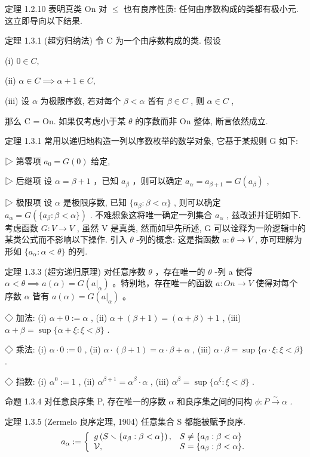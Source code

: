 \documentclass[]{article}
\begin{document}
定理 1.2.10 表明真类 On 对 $\leq$ 也有良序性质: 任何由序数构成的类都有极小元. 这立即导向以下结果. 

定理 1.3.1 (超穷归纳法) 令 C 为一个由序数构成的类. 假设 

(i) $0 \in C,$ 

(ii) $\alpha \in C \implies \alpha + 1 \in C,$ 

(iii) 设 $\alpha$ 为极限序数, 若对每个 $\beta < \alpha$ 皆有 $\beta \in C$ , 则 $\alpha \in C$ , 

那么 C = On. 如果仅考虑小于某 $\theta$ 的序数而非 On 整体, 断言依然成立. 

定理 1.3.1 常用以递归地构造一列以序数枚举的数学对象, 它基于某规则 G 如下: 

▷ 第零项 $a_{0}=G(0)$ 给定, 

▷ 后继项 设 $\alpha = \beta + 1$ ，已知 $a_{\beta}$ ，则可以确定 $a_{\alpha} = a_{\beta+1} = G(a_{\beta})$ , 

▷ 极限项 设 $\alpha$ 是极限序数, 已知 $\{a_{\beta} : \beta < \alpha\}$ , 则可以确定 $a_{\alpha} = G(\{a_{\beta} : \beta < \alpha\})$ . 不难想象这将唯一确定一列集合 $a_{\alpha}$ , 兹改述并证明如下. 考虑函数 $G : V \to V$ , 虽然 V 是真类, 然而如早先所述, G 可以诠释为一阶逻辑中的某类公式而不影响以下操作. 引入 $\theta$ -列的概念: 这是指函数 $a : \theta \to V$ , 亦可理解为形如 $\{a_{\alpha} : \alpha < \theta\}$ 的列. 

定理 1.3.3 (超穷递归原理) 对任意序数 $\theta$ ，存在唯一的 $\theta$ -列 a 使得 $\alpha < \theta \implies a(\alpha) = G(a|_{\alpha})$ 。特别地，存在唯一的函数 $a: On \to V$ 使得对每个序数 $\alpha$ 皆有 $a(\alpha) = G(a|_{\alpha})$ 。 

◇ 加法: (i) $\alpha+0:=\alpha$ , (ii) $\alpha+(\beta+1)=(\alpha+\beta)+1$ , (iii) $\alpha+\beta=\sup\{\alpha+\xi:\xi<\beta\}$ . 

◇ 乘法: (i) $\alpha \cdot 0 := 0$ , (ii) $\alpha \cdot (\beta + 1) = \alpha \cdot \beta + \alpha$ , (iii) $\alpha \cdot \beta = \sup\{\alpha \cdot \xi : \xi < \beta\}$ . 

◇ 指数: (i) $\alpha^{0} := 1$ , (ii) $\alpha^{\beta+1} = \alpha^{\beta} \cdot \alpha$ , (iii) $\alpha^{\beta} = \sup\{\alpha^{\xi} : \xi < \beta\}$ . 

命题 1.3.4 对任意良序集 P, 存在唯一的序数 $\alpha$ 和良序集之间的同构 $\phi: P \stackrel{\sim}{\to} \alpha$ . 

定理 1.3.5 (Zermelo 良序定理, 1904) 任意集合 S 都能被赋予良序.$$
a _ {\alpha} := \left\{ \begin{array}{l l} g \left(S \smallsetminus \{a _ {\beta}: \beta <   \alpha \}\right), & S \neq \{a _ {\beta}: \beta <   \alpha \} \\ \mathcal {V}, & S = \{a _ {\beta}: \beta <   \alpha \}. \end{array} \right.
$$
\end{document}
